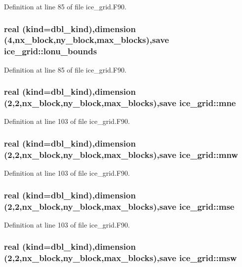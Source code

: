 Definition at line 85 of file ice\_\-grid.F90.\hypertarget{namespaceice__grid_abaf36c701426b67cd588146d434b1f99}{
\subsubsection[{lonu\_\-bounds}]{\setlength{\rightskip}{0pt plus 5cm}real (kind=dbl\_\-kind),dimension (4,nx\_\-block,ny\_\-block,max\_\-blocks),save {\bf ice\_\-grid::lonu\_\-bounds}}}
\label{namespaceice__grid_abaf36c701426b67cd588146d434b1f99}


Definition at line 85 of file ice\_\-grid.F90.\hypertarget{namespaceice__grid_ac0cdb9f8f4e8be0dcf32a5e7adb1ac53}{
\subsubsection[{mne}]{\setlength{\rightskip}{0pt plus 5cm}real (kind=dbl\_\-kind),dimension (2,2,nx\_\-block,ny\_\-block,max\_\-blocks),save {\bf ice\_\-grid::mne}}}
\label{namespaceice__grid_ac0cdb9f8f4e8be0dcf32a5e7adb1ac53}


Definition at line 103 of file ice\_\-grid.F90.\hypertarget{namespaceice__grid_a9d5b1bf4f3c68140602c96bf28865733}{
\subsubsection[{mnw}]{\setlength{\rightskip}{0pt plus 5cm}real (kind=dbl\_\-kind),dimension (2,2,nx\_\-block,ny\_\-block,max\_\-blocks),save {\bf ice\_\-grid::mnw}}}
\label{namespaceice__grid_a9d5b1bf4f3c68140602c96bf28865733}


Definition at line 103 of file ice\_\-grid.F90.\hypertarget{namespaceice__grid_a63866b0446065c97c825f70fc29a3654}{
\subsubsection[{mse}]{\setlength{\rightskip}{0pt plus 5cm}real (kind=dbl\_\-kind),dimension (2,2,nx\_\-block,ny\_\-block,max\_\-blocks),save {\bf ice\_\-grid::mse}}}
\label{namespaceice__grid_a63866b0446065c97c825f70fc29a3654}


Definition at line 103 of file ice\_\-grid.F90.\hypertarget{namespaceice__grid_a517a26693b149509ae9e4a6c2f310dda}{
\subsubsection[{msw}]{\setlength{\rightskip}{0pt plus 5cm}real (kind=dbl\_\-kind),dimension (2,2,nx\_\-block,ny\_\-block,max\_\-blocks),save {\bf ice\_\-grid::msw}}}
\label{namespaceice__grid_a517a26693b149509ae9e4a6c2f310dda}



